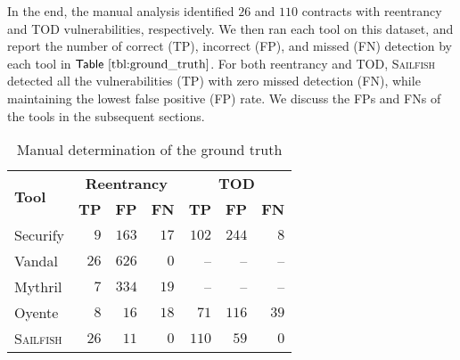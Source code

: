 \documentclass[conference, romanappendices]{tex/IEEEtran}
\theoremstyle{bfnote}
\newcommand{\toolname}{\textsc{Sailfish}\xspace}
\newcommand{\oyente}{{\sc Oyente}\xspace}
\newcommand{\securify}{{\sc Securify}\xspace}
\newcommand{\vandal}{{\sc Vandal}\xspace}
\newcommand{\reentrancy}{{reentrancy}\xspace}
\newcommand{\mythril}{{\sc Mythril}\xspace}
\newcommand{\Tbl}[1]{\ensuremath{\sf Table~\ref{#1}}}
\newcommand{\groundTruthDAO}{26}
\newcommand{\groundTruthTOD}{110}
\newcommand{\securifyTPDAO}{9}
\newcommand{\securifyFPDAO}{163}
\newcommand{\securifyFNDAO}{17}
\newcommand{\securifyTPTOD}{102}
\newcommand{\securifyFPTOD}{244}
\newcommand{\securifyFNTOD}{8}
\newcommand{\vandalTPDAO}{26}
\newcommand{\vandalFPDAO}{626}
\newcommand{\vandalFNDAO}{0}
\newcommand{\vandalTPTOD}{--}
\newcommand{\vandalFPTOD}{--}
\newcommand{\vandalFNTOD}{--}
\newcommand{\mythrilTPDAO}{7}
\newcommand{\mythrilFPDAO}{334}
\newcommand{\mythrilFNDAO}{19}
\newcommand{\mythrilTPTOD}{--}
\newcommand{\mythrilFPTOD}{--}
\newcommand{\mythrilFNTOD}{--}
\newcommand{\oyenteTPDAO}{8}
\newcommand{\oyenteFPDAO}{16}
\newcommand{\oyenteFNDAO}{18}
\newcommand{\oyenteTPTOD}{71}
\newcommand{\oyenteFPTOD}{116}
\newcommand{\oyenteFNTOD}{39}
\newcommand{\clintTPDAO}{26}
\newcommand{\clintFPDAO}{11}
\newcommand{\clintFNDAO}{0}
\newcommand{\clintTPTOD}{110}
\newcommand{\clintFPTOD}{59}
\newcommand{\clintFNTOD}{0}
\begin{document}
In the end, the manual analysis identified $\groundTruthDAO$ and $\groundTruthTOD$ contracts with \reentrancy and TOD vulnerabilities, respectively.
We then ran each tool on this dataset, and report the number of correct (TP), incorrect (FP), and missed (FN) detection by each tool in \Tbl{tbl:ground_truth}.
For both \reentrancy and TOD, \toolname detected all the vulnerabilities (TP) with zero missed detection (FN), while maintaining the lowest false positive (FP) rate.
We discuss the FPs and FNs of the tools in the subsequent sections.


\begin{table}[t]
	\centering
	\scriptsize
	\begin{tabular}{l|rrr|rrr}
		\toprule
		\multirow{2}{*}{\textbf{Tool}} & \multicolumn{3}{c|}{\textbf{Reentrancy}} & \multicolumn{3}{c}{\textbf{TOD}} \\ 
		\cline{2-7} 
		& \multicolumn{1}{c}{\textbf{TP}}& \textbf{FP} & \multicolumn{1}{c|}{\textbf{FN}} 
		& \multicolumn{1}{c}{\textbf{TP}} & \multicolumn{1}{c}{\textbf{FP}} & \multicolumn{1}{c}{\textbf{FN}} \\ 
		\midrule
		\rowcolor{black!10}	\securify & $\securifyTPDAO$ & $\securifyFPDAO$ & $\securifyFNDAO$ & $\securifyTPTOD$ & $\securifyFPTOD$ & $\securifyFNTOD$ \\
		\vandal & $\vandalTPDAO$ & $\vandalFPDAO$ & $\vandalFNDAO$ & \vandalTPTOD & \vandalFPTOD & \vandalFNTOD \\
		\rowcolor{black!10} \mythril & $\mythrilTPDAO$ & $\mythrilFPDAO$ & $\mythrilFNDAO$ & \mythrilTPTOD & \mythrilFPTOD & \mythrilFNTOD \\
		\oyente & $\oyenteTPDAO$ & $\oyenteFPDAO$ & $\oyenteFNDAO$ & $\oyenteTPTOD$ & $\oyenteFPTOD$ & $\oyenteFNTOD$ \\
		\rowcolor{black!10} \toolname & $\clintTPDAO$ & $\clintFPDAO$ & $\clintFNDAO$ & $\clintTPTOD$ & $\clintFPTOD$ & $\clintFNTOD$ \\
		\bottomrule
	\end{tabular}
	\vspace{-1mm}
	\caption{\small Manual determination of the ground truth}
	\label{tbl:ground_truth}
	\vspace{-6.5mm}
\end{table}
\end{document}
